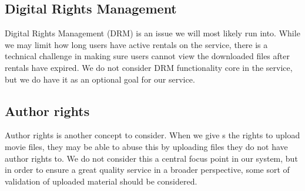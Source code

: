 \subsection{Digital Rights Management}
\label{Overview_assumptions_DRM}
Digital Rights Management (DRM) is an issue we will most likely run into. While we may limit how long users have active rentals on the service, there is a technical challenge in making sure users cannot view the downloaded files after rentals have expired. We do not consider DRM functionality core in the service, but we do have it as an optional goal for our service.
\subsection{Author rights}
\label{Overview_assumptions_Author}
Author rights is another concept to consider. When we give s the rights to upload movie files, they may be able to abuse this by uploading files they do not have author rights to. We do not consider this a central focus point in our system, but in order to ensure a great quality service in a broader perspective, some sort of validation of uploaded material should  be considered.